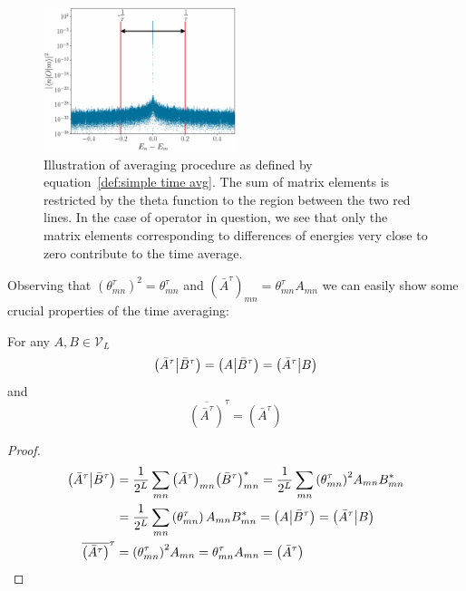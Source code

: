 \begin{figure}[htbp]
  \centering
  \includegraphics[width=0.5\textwidth]{Figures/cutoff_flat.pdf}
  \caption{Illustration of averaging procedure as defined by equation~\eqref{def:simple time avg}. The sum
  of matrix elements is restricted by the theta function to the region between the two red lines. In the case
  of operator in question, we see that only the matrix elements corresponding to differences of energies
  very close to zero contribute to the time average. }
  \label{fig:cutoff}
\end{figure}


Observing that \({\left(\theta_{mn}^{\tau}\right)}^2 = \theta_{mn}^{\tau}\) and \({\left(\bar{A}^{\tau}\right)}_{mn} =
\theta_{mn}^{\tau} A_{mn}\) we can easily show some crucial properties of the time averaging:
\begin{proposition}
  For any \(A,B \in \mathcal{V}_L\)
  \begin{equation*}
    \left(\bar{A}^{\tau} \middle| \bar{B}^{\tau}\right) = \left(A \middle| \bar{B}^{\tau}\right) = \left(\bar{A}^{\tau} \middle| B\right)
  \end{equation*}
  and
  \begin{equation*}
    \overline{\left(\bar{A}^{\tau}\right)}^{\tau} = \left(\bar{A}^{\tau}\right)
  \end{equation*}
  \label{prop:projection}
\end{proposition}

\begin{proof}
  \begin{align*}
    \left(\bar{A}^{\tau} \middle| \bar{B}^{\tau}\right)  & = \frac{1}{2^L} \sum_{mn} {\left(\bar{A}^{\tau}\right)}_{mn}
    {\left(\bar{B}^{\tau}\right)}_{mn}^{\ast} = \frac{1}{2^L} \sum_{mn} {\left(\theta_{mn}^{\tau}\right)}^2 A_{mn} B_{mn}^{\ast} \nonumber{}               \\
    & = \frac{1}{2^L} \sum_{mn} \left(\theta_{mn}^{\tau}\right) A_{mn} B_{mn}^{\ast} =
    \left(A \middle| \bar{B}^{\tau}\right) = \left(\bar{A}^{\tau} \middle| B\right)                                                                                                        \\
    \overline{\left(\bar{A}^{\tau}\right)}^{\tau} & = {\left(\theta_{mn}^{\tau}\right)}^2 A_{mn} = \theta_{mn}^{\tau} A_{mn} = \left(\bar{A}^{\tau}\right)
  \end{align*}
  
\end{proof}

